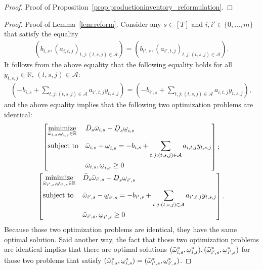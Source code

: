 \documentclass[nonblindrev,mnsc]{informs3} %
\def\Real{\mathbb{R}}
\let\R\Real
\newcommand{\ubar}[1]{\text{\b{$#1$}}}
\begin{document}
\begin{APPENDICES}
\begin{proof}{Proof of Proposition~\ref{prop:productioninventory_reformulation}.}
\halmos \end{proof}

\begin{proof}{Proof of Lemma~\ref{lem:reform}.} Consider any  $s \in [T]$ and $i,i' \in \{0,\ldots,m\}$ that satisfy the equality
    \begin{align*}
\left(b_{i,s}, \left( a_{i,t,j} \right)_{t,j: (t,s,j) \in \mathcal{A}}\right) = \left(b_{i',s}, \left( a_{i',t,j} \right)_{t,j: (t,s,j) \in \mathcal{A}}\right).
    \end{align*}
  It follows from the above equality that the following equality holds for all $y_{t,s,j} \in \R$, $(t,s,j) \in \mathcal{A}$:   
    \begin{align*}
    \left( - b_{i,s} + \sum_{t,j: (t,s,j) \in \mathcal{A}} a_{i',t,j} y_{t,s,j} \right) = \left( - b_{i',s} + \sum_{t,j: (t,s,j) \in \mathcal{A}} a_{i,t,j} y_{t,s,j} \right),
    \end{align*}
    and the above equality implies that the following two optimization problems are identical:
     \begin{gather*}
\left[ \begin{aligned}
&\underset{\bar{\omega}_{i,s},\ubar{\omega}_{i,s} \in \R}{\text{minimize}}&& \bar{D}_s  \bar{\omega}_{i,s}  - \ubar{D}_s \ubar{\omega}_{i,s}  \\
    &\textnormal{subject to}&& \bar{\omega}_{i,s} - \ubar{\omega}_{i,s} =  -b_{i,s} + \sum_{t,j: (t,s,j) \in \mathcal{A}}  a_{i,t,j}  y_{t,s,j} \\
        &&& \bar{\omega}_{i,s}, \ubar{\omega}_{i,s} \ge 0 
    \end{aligned} \right]; \\
    \left[ \begin{aligned}
&\underset{\bar{\omega}_{i',s},\ubar{\omega}_{i',s} \in \R}{\text{minimize}}&& \bar{D}_s  \bar{\omega}_{i',s}  - \ubar{D}_s \ubar{\omega}_{i',s}  \\
    &\textnormal{subject to}&& \bar{\omega}_{i',s} - \ubar{\omega}_{i',s} =  -b_{i',s} + \sum_{t,j: (t,s,j) \in \mathcal{A}}  a_{i',t,j}  y_{t,s,j} \\
        &&& \bar{\omega}_{i',s}, \ubar{\omega}_{i',s} \ge 0 
    \end{aligned} \right]. 
\end{gather*}
Because those two optimization problems are identical, they have the same optimal solution. Said another way, the fact that those two optimization problems are identical implies that there are optimal solutions $(\bar{\omega}^*_{i,s}, \ubar{\omega}^*_{i,s}),(\bar{\omega}^*_{i',s}, \ubar{\omega}^*_{i',s})$ for those two problems that satisfy $(\bar{\omega}^*_{i,s}, \ubar{\omega}^*_{i,s}) = (\bar{\omega}^*_{i',s}, \ubar{\omega}^*_{i',s})$. 

\end{proof}
\end{APPENDICES}
\end{document}
